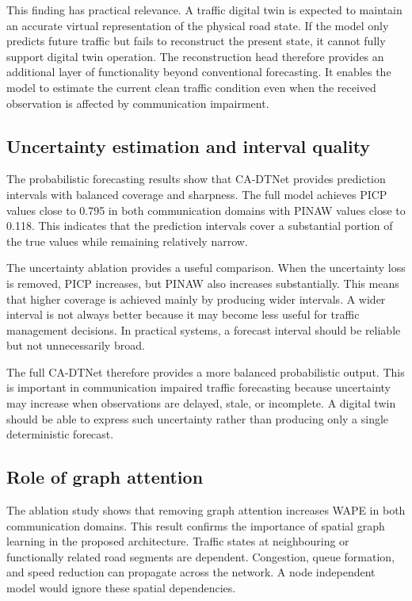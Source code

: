 \documentclass[pdflatex,sn-mathphys-num]{sn-jnl}%
\theoremstyle{thmstyleone}%
\theoremstyle{thmstyletwo}%
\theoremstyle{thmstylethree}%
\begin{document}
This finding has practical relevance. A traffic digital twin is expected to maintain an accurate virtual representation of the physical road state. If the model only predicts future traffic but fails to reconstruct the present state, it cannot fully support digital twin operation. The reconstruction head therefore provides an additional layer of functionality beyond conventional forecasting. It enables the model to estimate the current clean traffic condition even when the received observation is affected by communication impairment.

\subsection{Uncertainty estimation and interval quality}
\label{subsec:discussion_uncertainty}

The probabilistic forecasting results show that CA-DTNet provides prediction intervals with balanced coverage and sharpness. The full model achieves PICP values close to 0.795 in both communication domains with PINAW values close to 0.118. This indicates that the prediction intervals cover a substantial portion of the true values while remaining relatively narrow.

The uncertainty ablation provides a useful comparison. When the uncertainty loss is removed, PICP increases, but PINAW also increases substantially. This means that higher coverage is achieved mainly by producing wider intervals. A wider interval is not always better because it may become less useful for traffic management decisions. In practical systems, a forecast interval should be reliable but not unnecessarily broad.

The full CA-DTNet therefore provides a more balanced probabilistic output. This is important in communication impaired traffic forecasting because uncertainty may increase when observations are delayed, stale, or incomplete. A digital twin should be able to express such uncertainty rather than producing only a single deterministic forecast.

\subsection{Role of graph attention}
\label{subsec:discussion_graph_attention}

The ablation study shows that removing graph attention increases WAPE in both communication domains. This result confirms the importance of spatial graph learning in the proposed architecture. Traffic states at neighbouring or functionally related road segments are dependent. Congestion, queue formation, and speed reduction can propagate across the network. A node independent model would ignore these spatial dependencies.
\end{document}
